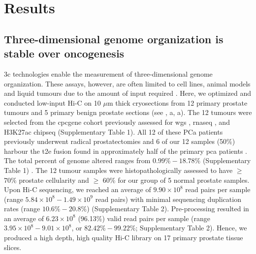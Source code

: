 \section{Results}

\subsection{Three-dimensional genome organization is stable over oncogenesis}

\Gls{3c} technologies enable the measurement of three-dimensional genome organization.
These assays, however, are often limited to cell lines, animal models and liquid tumours due to the amount of input required \cite{liebermanaidenComprehensiveMappingLongRange2009}.
Here, we optimized and conducted low-input Hi-C \cite{diazChromatinConformationAnalysis2018} on 10 $\mu$m thick cryosections from 12 primary prostate tumours and 5 primary benign prostate sections (see , a, a).
The 12 tumours were selected from the \gls{cpcgene} cohort previously assessed for \gls{wgs} \cite{fraserGenomicHallmarksLocalized2017}, \gls{rnaseq} \cite{chenWidespreadFunctionalRNA2019}, and H3K27ac \gls{chipseq} \cite{kronTMPRSS2ERGFusion2017,mazrooeiCistromePartitioningReveals2019} (Supplementary Table 1).
All 12 of these PCa patients previously underwent radical prostatectomies and 6 of our 12 samples (50\%) harbour the \gls{t2e} fusion found in approximately half of the primary \gls{pca} patients \cite{fraserGenomicHallmarksLocalized2017}.
The total percent of genome altered ranges from $0.99\%-18.78\%$ (Supplementary Table 1) \cite{fraserGenomicHallmarksLocalized2017}.
The 12 tumour samples were histopathologically assessed to have $\ge$ 70\% prostate cellularity and $\ge$ 60\% for our group of 5 normal prostate samples.
Upon Hi-C sequencing, we reached an average of $9.90 \times 10^8$  read pairs per sample (range $5.84 \times 10^8 - 1.49 \times 10^9$ read pairs) with minimal sequencing duplication rates (range $10.6\% - 20.8\%$) (Supplementary Table 2).
Pre-processing resulted in an average of $6.23 \times 10^8$ (96.13\%) valid read pairs per sample (range $3.95 \times 10^8 - 9.01 \times 10^8$, or $82.42\% - 99.22\%$; Supplementary Table 2).
Hence, we produced a high depth, high quality Hi-C library on 17 primary prostate tissue slices.

